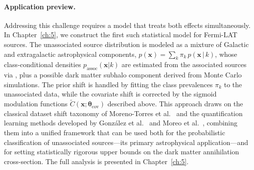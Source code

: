 \paragraph{Application preview.}

Addressing this challenge requires a model that treats both effects simultaneously.
In Chapter~\ref{ch:5}, we construct the first such statistical model for Fermi-LAT sources.
The unassociated source distribution is modeled as a mixture of Galactic and extragalactic astrophysical components, $p(\mathbf{x}) = \sum_{k}\pi_k\,p(\mathbf{x}\,|\,k)$, whose class-conditional densities $p_{\text{assoc}}(\mathbf{x}|k)$ are estimated from the associated sources via \KDE, plus a possible dark matter subhalo component derived from Monte Carlo simulations.
The prior shift is handled by fitting the class prevalences $\pi_k$ to the unassociated data, while the covariate shift is corrected by the sigmoid modulation functions $\tilde{C}(\mathbf{x};\boldsymbol{\theta}_{\text{cov}})$ described above.
This approach draws on the classical dataset shift taxonomy of Moreno-Torres et al.~\cite{MorenoTorres2012AUV} and the quantification learning methods developed by Gonz\'alez et al.~\cite{10.1145/3117807_Gonzalez_quantification} and Moreo et al.~\cite{2024arXiv240100490M}, combining them into a unified framework that can be used both for the probabilistic classification of unassociated sources---its primary astrophysical application---and for setting statistically rigorous upper bounds on the dark matter annihilation cross-section.
The full analysis is presented in Chapter~\ref{ch:5}.
